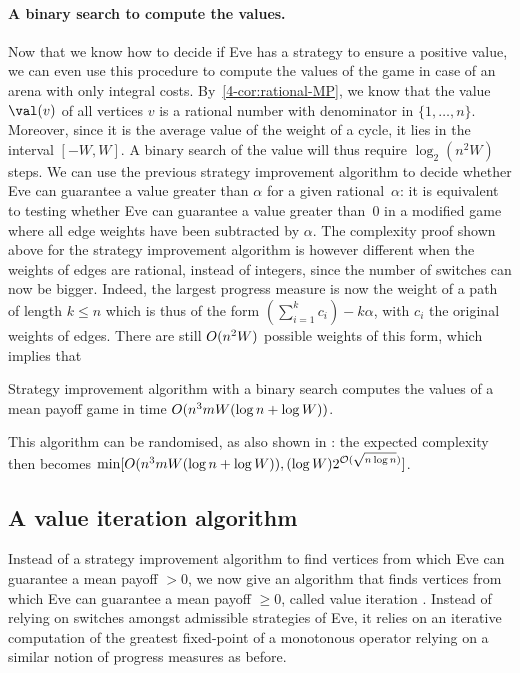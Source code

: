\paragraph{A binary search to compute the values.}
Now that we know how to decide if Eve has a strategy to ensure a
positive value, we can even use this procedure to compute the values
of the game in case of an arena with only integral
costs. By~\cref{4-cor:rational-MP}, we know that the value $\val(v)$
of all vertices $v$ is a rational number with denominator in
$\{1,\ldots,n\}$. Moreover, since it is the average value of the
weight of a cycle, it lies in the interval $[-W,W]$. A binary search
of the value will thus require $\log_2(n^2W)$ steps. We can use the
previous strategy improvement algorithm to decide whether Eve can
guarantee a value greater than $\alpha$ for a given rational~$\alpha$:
it is equivalent to testing whether Eve can guarantee a value greater
than~$0$ in a modified game where all edge weights have been
subtracted by $\alpha$. The complexity proof shown above for the
strategy improvement algorithm is however different when the weights
of edges are rational, instead of integers, since the number of
switches can now be bigger. Indeed, the largest progress measure is
now the weight of a path of length $k\leq n$ which is thus of the form
$(\sum_{i=1}^k c_i)-k\alpha$, with $c_i$ the original weights of
edges. There are still $O(n^2W)$ possible weights of this form,
which implies that
\begin{theorem}\label{4-thm:MP-strategy-improvement-binary-search}
  Strategy improvement algorithm with a binary search computes the
  values of a mean payoff game in time
  $O(n^3 mW(\log n+\log W))$.
\end{theorem}

This algorithm can be randomised, as also shown in
\cite{Bjorklund&Vorobyov:2007}: the expected complexity then becomes
$\min[O(n^3 mW(\log n+\log W)),(\log W) 2^{\mathcal
  O(\sqrt{n\log n})}]$.
  
  
\subsection*{A value iteration algorithm}
Instead of a strategy improvement algorithm to find vertices from
which Eve can guarantee a mean payoff $>0$, we now give an algorithm
that finds vertices from which Eve can guarantee a mean payoff
$\geq 0$, called value iteration
\cite{Brim&Chaloupka&Doyen&Gentilini&Raskin:2011}. Instead of relying
on switches amongst admissible strategies of Eve, it relies on an
iterative computation of the greatest fixed-point of a monotonous
operator relying on a similar notion of progress measures as before.

